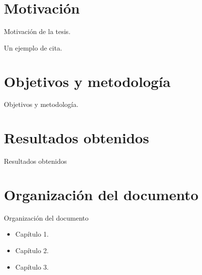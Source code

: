 \cite{chambo}
\section{Motivación}

Motivación de la tesis.

Un ejemplo de cita.\cite{web:unlp}

\section{Objetivos y metodología}

Objetivos y metodología.

\section{Resultados obtenidos}

Resultados obtenidos

\section{Organización del documento}

Organización del documento

\begin{itemize}
    \item Capítulo 1.
    \item Capítulo 2.
    \item Capítulo 3.
\end{itemize}